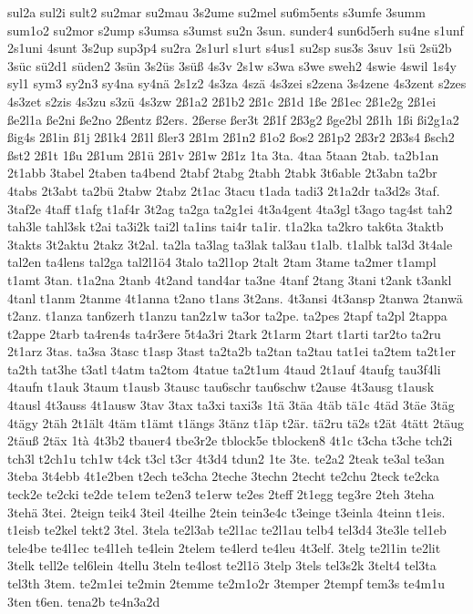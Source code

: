 {sul2a
sul2i
sult2
su2mar
su2mau
3s2ume
su2mel
su6m5ents
s3umfe
3summ
sum1o2
su2mor
s2ump
s3umsa
s3umst
su2n
3sun.
sunder4
sun6d5erh
su4ne
s1unf
2s1uni
4sunt
3s2up
sup3p4
su2ra
2s1url
s1urt
s4us1
su2sp
sus3s
3suv
1sü
2sü2b
3süc
sü2d1
süden2
3sün
3s2üs
3süß
4s3v
2s1w
s3wa
s3we
sweh2
4swie
4swil
1s4y
syl1
sym3
sy2n3
sy4na
sy4nä
2s1z2
4s3za
4szä
4s3zei
s2zena
3s4zene
4s3zent
s2zes
4s3zet
s2zis
4s3zu
s3zü
4s3zw
2ß1a2
2ß1b2
2ß1c
2ß1d
1ße
2ß1ec
2ß1e2g
2ß1ei
ße2l1a
ße2ni
ße2no
2ßentz
ß2ers.
2ßerse
ßer3t
2ß1f
2ß3g2
ßge2bl
2ß1h
1ßi
ßi2g1a2
ßig4s
2ß1in
ß1j
2ß1k4
2ß1l
ßler3
2ß1m
2ß1n2
ß1o2
ßos2
2ß1p2
2ß3r2
2ß3s4
ßsch2
ßst2
2ß1t
1ßu
2ß1um
2ß1ü
2ß1v
2ß1w
2ß1z
1ta
3ta.
4taa
5taan
2tab.
ta2b1an
2t1abb
3tabel
2taben
ta4bend
2tabf
2tabg
2tabh
2tabk
3t6able
2t3abn
ta2br
4tabs
2t3abt
ta2bü
2tabw
2tabz
2t1ac
3tacu
t1ada
tadi3
2t1a2dr
ta3d2s
3taf.
3taf2e
4taff
t1afg
t1af4r
3t2ag
ta2ga
ta2g1ei
4t3a4gent
4ta3gl
t3ago
tag4st
tah2
tah3le
tahl3sk
t2ai
ta3i2k
tai2l
ta1ins
tai4r
ta1ir.
t1a2ka
ta2kro
tak6ta
3taktb
3takts
3t2aktu
2takz
3t2al.
ta2la
ta3lag
ta3lak
tal3au
t1alb.
t1albk
tal3d
3t4ale
tal2en
ta4lens
tal2ga
tal2l1ö4
3talo
ta2l1op
2talt
2tam
3tame
ta2mer
t1ampl
t1amt
3tan.
t1a2na
2tanb
4t2and
tand4ar
ta3ne
4tanf
2tang
3tani
t2ank
t3ankl
4tanl
t1anm
2tanme
4t1anna
t2ano
t1ans
3t2ans.
4t3ansi
4t3ansp
2tanwa
2tanwä
t2anz.
t1anza
tan6zerh
t1anzu
tan2z1w
ta3or
ta2pe.
ta2pes
2tapf
ta2pl
2tappa
t2appe
2tarb
ta4ren4s
ta4r3ere
5t4a3ri
2tark
2t1arm
2tart
t1arti
tar2to
ta2ru
2t1arz
3tas.
ta3sa
3tasc
t1asp
3tast
ta2ta2b
ta2tan
ta2tau
tat1ei
ta2tem
ta2t1er
ta2th
tat3he
t3atl
t4atm
ta2tom
4tatue
ta2t1um
4taud
2t1auf
4taufg
tau3f4li
4taufn
t1auk
3taum
t1ausb
3tausc
tau6schr
tau6schw
t2ause
4t3ausg
t1ausk
4tausl
4t3auss
4t1ausw
3tav
3tax
ta3xi
taxi3s
1tä
3täa
4täb
tä1c
4täd
3täe
3täg
4tägy
2täh
2t1ält
4täm
t1ämt
t1ängs
3tänz
t1äp
t2är.
tä2ru
tä2s
t2ät
4tätt
2täug
2täuß
2täx
1tà
4t3b2
tbauer4
tbe3r2e
tblock5e
tblocken8
4t1c
t3cha
t3che
tch2i
tch3l
t2ch1u
tch1w
t4ck
t3cl
t3cr
4t3d4
tdun2
1te
3te.
te2a2
2teak
te3al
te3an
3teba
3t4ebb
4t1e2ben
t2ech
te3cha
2teche
3techn
2techt
te2chu
2teck
te2cka
teck2e
te2cki
te2de
te1em
te2en3
te1erw
te2es
2teff
2t1egg
teg3re
2teh
3teha
3tehä
3tei.
2teign
teik4
3teil
4teilhe
2tein
tein3e4c
t3einge
t3einla
4teinn
t1eis.
t1eisb
te2kel
tekt2
3tel.
3tela
te2l3ab
te2l1ac
te2l1au
telb4
tel3d4
3te3le
tel1eb
tele4be
te4l1ec
te4l1eh
te4lein
2telem
te4lerd
te4leu
4t3elf.
3telg
te2l1in
te2lit
3telk
tell2e
tel6lein
4tellu
3teln
te4lost
te2l1ö
3telp
3tels
tel3s2k
3telt4
tel3ta
tel3th
3tem.
te2m1ei
te2min
2temme
te2m1o2r
3temper
2tempf
tem3s
te4m1u
3ten
t6en.
tena2b
te4n3a2d
}
